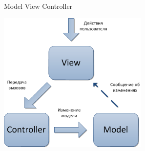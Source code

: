 \begin{frame}[fragile]{Model View Controller}
  \begin{center}
    \includegraphics[height=7cm,keepaspectratio]{sources/images/mvc.png}
  \end{center}
\end{frame}
